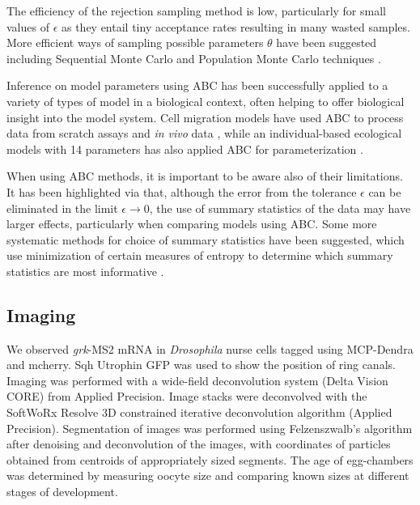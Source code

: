 \documentclass[twocolumn]{biophys}
\begin{document}
The efficiency of the rejection sampling method is low, particularly for small values of $\epsilon$ as they entail tiny acceptance rates resulting in many wasted samples. 
More efficient ways of sampling possible parameters $\theta$ have been suggested including Sequential Monte Carlo and Population Monte Carlo techniques \citep{toni2009approximate, sisson2007sequential, beaumont2009adaptive, lenormand2013adaptive}.

Inference on model parameters using ABC has been successfully applied to a variety of types of model in a biological context, often helping to offer biological insight into the model system.
Cell migration models have used ABC to process data from scratch assays \citep{johnston2014interpreting} and \textit{in vivo} data \citep{liepe2012calibrating}, while an individual-based ecological models with 14 parameters has also applied ABC for parameterization \citep{van2015calibration}. 

When using ABC methods, it is important to be aware also of their limitations. 
It has been highlighted via \citet{robert2011lack} that, although the error from the tolerance $\epsilon$ can be eliminated in the limit $\epsilon \rightarrow 0$, the use of summary statistics of the data may have larger effects, particularly when comparing models using ABC.
Some more systematic methods for choice of summary statistics have been suggested, which use minimization of certain measures of entropy to determine which summary statistics are most informative \citep{nunes2010optimal}.


\subsection{Imaging}
We observed \textit{grk}-MS2 mRNA in \textit{Drosophila} nurse cells tagged using MCP-Dendra and mcherry. 
Sqh Utrophin GFP was used to show the position of ring canals.
Imaging was performed with a wide-field deconvolution system (Delta Vision CORE) from Applied Precision. 
Image stacks were deconvolved with the SoftWoRx Resolve 3D constrained iterative deconvolution algorithm (Applied Precision). 
Segmentation of images was performed using Felzenszwalb's algorithm \citep{felzenszwalb2004efficient} after denoising and deconvolution of the images, with coordinates of particles obtained from centroids of appropriately sized segments. 
The age of egg-chambers was determined by measuring oocyte size and comparing known sizes at different stages of development.
\end{document}
